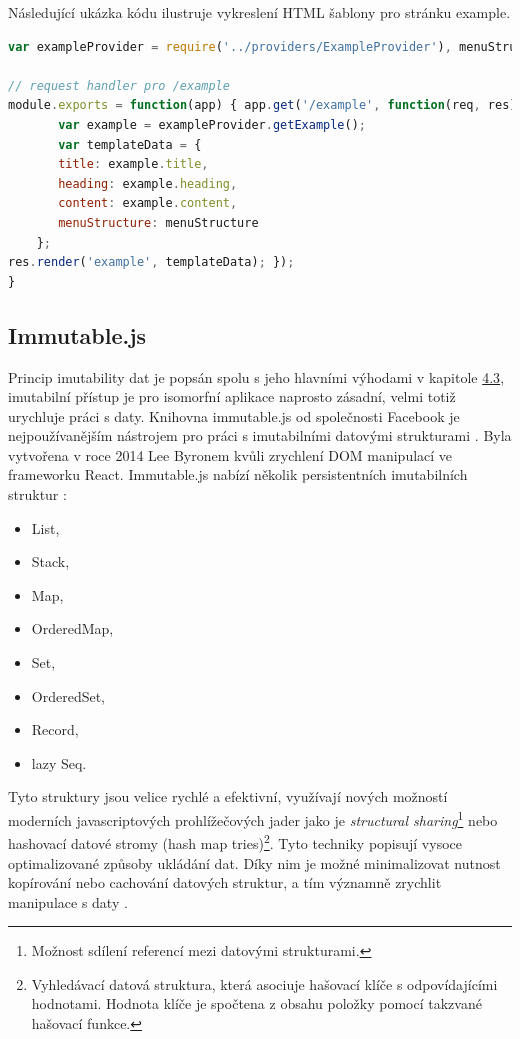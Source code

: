 Následující ukázka kódu ilustruje vykreslení HTML šablony pro stránku example.
\begin{lstlisting}[language=Javascript, caption= Ukázkové vykreslení šablony pomocí frameworku express \cite{express}]
var exampleProvider = require('../providers/ExampleProvider'), menuStructure = require('../MenuStructure');

// request handler pro /example
module.exports = function(app) { app.get('/example', function(req, res) {
       var example = exampleProvider.getExample(); 
       var templateData = {
       title: example.title, 
       heading: example.heading, 
       content: example.content, 
       menuStructure: menuStructure
    };
res.render('example', templateData); });
}
\end{lstlisting}

\subsection{Immutable.js}
\label{sec:immutable_js}
Princip imutability dat je popsán spolu s jeho hlavními výhodami v kapitole \hyperref[sec:immutability]{4.3}, imutabilní přístup je pro isomorfní aplikace naprosto zásadní, velmi totiž urychluje práci s daty. Knihovna immutable.js od společnosti Facebook je nejpoužívanějším nástrojem pro práci s imutabilními datovými strukturami \cite{immutablejs}. Byla vytvořena v roce 2014 Lee Byronem kvůli zrychlení DOM manipulací ve frameworku React. Immutable.js nabízí několik persistentních imutabilních struktur \cite{immutablejs}: 

\begin{itemize}
\item List,
\item Stack,
\item Map,
\item OrderedMap,
\item Set,
\item OrderedSet,
\item Record,
\item lazy Seq.
\end{itemize}

Tyto struktury jsou velice rychlé a efektivní, využívají nových možností moderních javascriptových prohlížečových jader jako je \textit{structural sharing}\footnote{Možnost sdílení referencí mezi datovými strukturami.} nebo hashovací datové stromy (hash map tries)\footnote{Vyhledávací datová struktura, která asociuje hašovací klíče s odpovídajícími hodnotami. Hodnota klíče je spočtena z obsahu položky pomocí takzvané hašovací funkce.}. Tyto techniky popisují vysoce optimalizované způsoby ukládání dat. Díky nim je možné minimalizovat nutnost kopírování nebo cachování datových struktur, a tím významně zrychlit manipulace s daty \cite{immutablejs} \cite{immutablejs_learn}.

